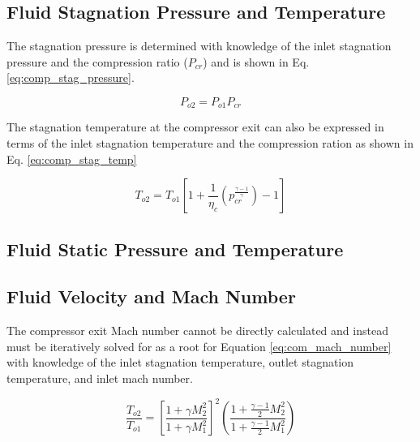 \subsection{Fluid Stagnation Pressure and Temperature}
The stagnation pressure is determined with knowledge of the inlet stagnation pressure and the compression ratio ($P_{cr}$) and is
shown in Eq. \ref{eq:comp_stag_pressure}.

\begin{equation}
\label{eq:comp_stag_pressure}
P_{o2} = P_{o1}P_{cr}
\end{equation}

The stagnation temperature at the compressor exit can also be expressed in terms of the inlet stagnation temperature and the 
compression ration as shown in Eq. \ref{eq:comp_stag_temp}

\begin{equation}
\label{eq:comp_stag_temp}
T_{o2}=T_{o1}\left[1 + \frac{1}{\eta_c}\left(p_{cr}^{\frac{\gamma-1}{\gamma}}\right)-1\right]
\end{equation}

\subsection{Fluid Static Pressure and Temperature}

\subsection{Fluid Velocity and Mach Number}
The compressor exit Mach number cannot be directly calculated and instead must be iteratively solved for as a root for 
Equation \ref{eq:com_mach_number} with knowledge of the inlet stagnation temperature, outlet stagnation temperature, and inlet mach number.

\begin{equation}
\label{eq:com_mach_number}
\frac{T_{o2}}{T_{o1}} = \left[\frac{1 + \gamma M^2_2}{1 + \gamma M^2_1} \right]^2 \left(\frac{1 + \frac{\gamma-1}{2}M^2_2}{1 + \frac{\gamma - 1}{2}M^2_1} \right)
\end{equation}

